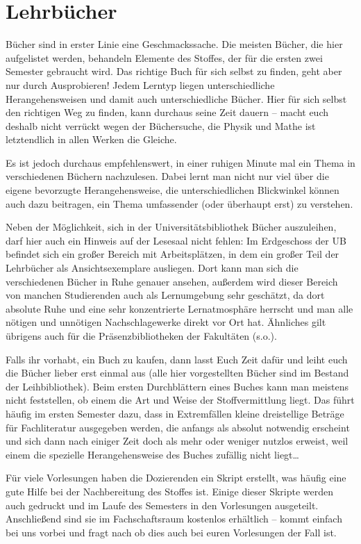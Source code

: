 \section{Lehrbücher}

Bücher sind in erster Linie eine Geschmackssache. Die meisten Bücher, die
hier aufgelistet werden, behandeln Elemente des Stoffes, der für die ersten
zwei Semester gebraucht wird. Das richtige Buch für sich selbst zu finden,
geht aber nur durch Ausprobieren! Jedem Lerntyp liegen unterschiedliche
Herangehensweisen und damit auch unterschiedliche Bücher. Hier für sich
selbst den richtigen Weg zu finden, kann durchaus seine Zeit dauern -- macht
euch deshalb nicht verrückt wegen der Büchersuche, die Physik und Mathe ist
letztendlich in allen Werken die Gleiche.

Es ist jedoch durchaus empfehlenswert, in einer ruhigen Minute mal ein Thema
in verschiedenen Büchern nachzulesen. Dabei lernt man nicht nur viel über die
eigene bevorzugte Herangehensweise, die unterschiedlichen Blickwinkel können
auch dazu beitragen, ein Thema umfassender (oder überhaupt erst) zu verstehen.

Neben der Möglichkeit, sich in der Universitätsbibliothek Bücher auszuleihen, darf hier auch ein Hinweis auf der Lesesaal nicht fehlen:
 Im Erdgeschoss der UB befindet sich ein großer Bereich mit Arbeitsplätzen, in dem ein großer Teil der Lehrbücher als Ansichtsexemplare ausliegen.
Dort kann man sich die verschiedenen Bücher in Ruhe genauer ansehen, außerdem wird dieser Bereich von manchen Studierenden auch als Lernumgebung
 sehr geschätzt, da dort absolute Ruhe und eine sehr konzentrierte
 Lernatmosphäre herrscht und man alle nötigen und unnötigen
Nachschlagewerke direkt vor Ort hat. Ähnliches gilt übrigens auch für die Präsenzbibliotheken der Fakultäten (s.o.).

Falls ihr vorhabt, ein Buch zu kaufen, dann lasst Euch Zeit dafür und leiht euch
die Bücher lieber erst einmal aus (alle hier vorgestellten Bücher sind im Bestand
der Leihbibliothek). Beim ersten Durchblättern eines Buches kann man meistens
nicht feststellen, ob einem die Art und Weise der Stoffvermittlung liegt. Das
führt häufig im ersten Semester dazu, dass in Extremfällen kleine dreistellige
Beträge für Fachliteratur ausgegeben werden, die anfangs als absolut notwendig
erscheint und sich dann nach einiger Zeit doch als mehr oder weniger nutzlos
erweist, weil einem die spezielle Herangehensweise des Buches zufällig nicht liegt\dots

Für viele Vorlesungen haben die Dozierenden ein Skript erstellt, was häufig eine gute
Hilfe bei der Nachbereitung des Stoffes ist. Einige dieser Skripte werden auch gedruckt und im Laufe des Semesters in den Vorlesungen ausgeteilt. Anschließend sind sie im Fachschaftsraum kostenlos erhältlich -- kommt einfach bei uns
vorbei und fragt nach ob dies auch bei euren Vorlesungen der Fall ist.

